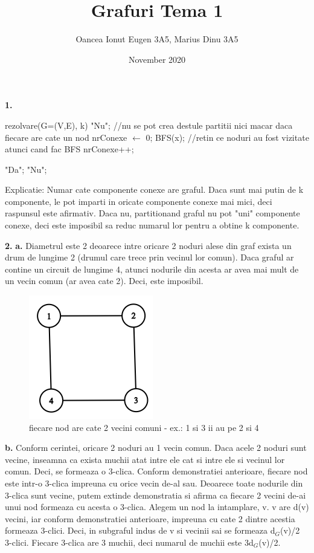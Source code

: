 \documentclass{article}
\title{Grafuri Tema 1}
\author{Oancea Ionut Eugen 3A5, Marius Dinu 3A5}
\date{November 2020}
\begin{document}
\maketitle

{\bf 1.}
\begin{algorithmic}
\STATE rezolvare(G=(V,E), k)
    \RETURN "Nu"; //nu se pot crea destule partitii nici macar daca fiecare are cate un nod
\ENDIF
\STATE nrConexe $\gets$ 0;
        \STATE BFS(x); //retin ce noduri au fost vizitate atunci cand fac BFS
        \STATE nrConexe++;
    \ENDIF
\ENDFOR

    \RETURN "Da";
\ELSE
    \RETURN "Nu";
\ENDIF
\end{algorithmic}
\vspace{0.5cm}

Explicatie: Numar cate componente conexe are graful. Daca sunt mai putin de k componente, le pot imparti in oricate componente conexe mai mici, deci raspunsul este afirmativ. Daca nu, partitionand graful nu pot "uni" componente conexe, deci este imposibil sa reduc numarul lor pentru a obtine k componente.

\vspace{0.5cm}

{\bf 2.} {\bf a.} Diametrul este 2 deoarece intre oricare 2 noduri alese din graf exista un drum de lungime 2 (drumul care trece prin vecinul lor comun). Daca graful ar contine un circuit de lungime 4, atunci nodurile din acesta ar avea mai mult de un vecin comun (ar avea cate 2). Deci, este imposibil. 
\begin{figure}[H]
\centering
\includegraphics[scale=0.5]{graph1.png}
\caption{fiecare nod are cate 2 vecini comuni - ex.: 1 si 3 ii au pe 2 si 4}
\end{figure}

{\bf b.} Conform cerintei, oricare 2 noduri au 1 vecin comun. Daca acele 2 noduri sunt vecine, inseamna ca exista muchii atat intre ele cat si intre ele si vecinul lor comun. Deci, se formeaza o 3-clica. Conform demonstratiei anterioare, fiecare nod este intr-o 3-clica impreuna cu orice vecin de-al sau. Deoarece toate nodurile din 3-clica sunt vecine, putem extinde demonstratia si afirma ca fiecare 2 vecini de-ai unui nod formeaza cu acesta o 3-clica. Alegem un nod la intamplare, v. v are d(v) vecini, iar conform demonstratiei anterioare, impreuna cu cate 2 dintre acestia formeaza 3-clici. Deci, in subgraful indus de v si vecinii sai se formeaza d$_G$(v)/2 3-clici. Fiecare 3-clica are 3 muchii, deci numarul de muchii este 3d$_G$(v)/2.
\end{document}
